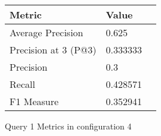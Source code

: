 \begin{figure}[H]
\begin{center}
\begin{tabular}{lll}
\toprule
{}                      Metric &         Value \\
\midrule
     Average Precision &     0.625 \\
  Precision at 3 (P@3) &  0.333333 \\
             Precision &       0.3 \\
                Recall &  0.428571 \\
            F1 Measure &  0.352941 \\
\bottomrule
\end{tabular}
\end{center}
\caption{Query 1 Metrics in configuration 4}
\label{fig:query_1_metrics_config_4}
\end{figure}